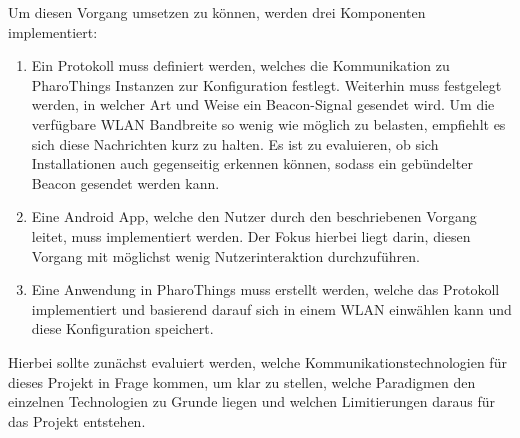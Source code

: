     Um diesen Vorgang umsetzen zu können, werden drei Komponenten implementiert:
    \begin{enumerate}
        \item Ein Protokoll muss definiert werden, welches die Kommunikation zu PharoThings Instanzen zur Konfiguration festlegt.
        Weiterhin muss festgelegt werden, in welcher Art und Weise ein Beacon-Signal gesendet wird.
        Um die verfügbare WLAN Bandbreite so wenig wie möglich zu belasten, empfiehlt es sich diese Nachrichten kurz zu halten. Es ist zu evaluieren,
        ob sich Installationen auch gegenseitig erkennen können, sodass ein gebündelter Beacon gesendet werden kann.
        \item Eine Android App, welche den Nutzer durch den beschriebenen Vorgang leitet, muss implementiert werden.
        Der Fokus hierbei liegt darin, diesen Vorgang mit möglichst wenig Nutzerinteraktion durchzuführen.
        \item Eine Anwendung in PharoThings muss erstellt werden, welche das Protokoll implementiert
        und basierend darauf sich in einem WLAN einwählen kann und diese Konfiguration speichert.
    \end{enumerate}
    Hierbei sollte zunächst evaluiert werden, welche Kommunikationstechnologien für dieses Projekt in Frage kommen, um klar zu stellen, welche Paradigmen den einzelnen Technologien zu Grunde liegen und welchen Limitierungen daraus für das Projekt entstehen.